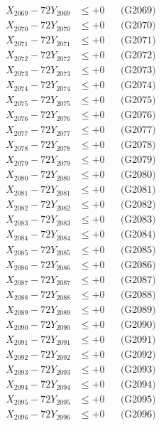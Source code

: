 \documentclass[a4paper,10pt]{article}
\begin{document}
{\begin{align}
X_{2069} - 72Y_{2069} &\leq +0 && \text{(G2069)} \\
X_{2070} - 72Y_{2070} &\leq +0 && \text{(G2070)} \\
\allowbreak
X_{2071} - 72Y_{2071} &\leq +0 && \text{(G2071)} \\
X_{2072} - 72Y_{2072} &\leq +0 && \text{(G2072)} \\
X_{2073} - 72Y_{2073} &\leq +0 && \text{(G2073)} \\
X_{2074} - 72Y_{2074} &\leq +0 && \text{(G2074)} \\
X_{2075} - 72Y_{2075} &\leq +0 && \text{(G2075)} \\
X_{2076} - 72Y_{2076} &\leq +0 && \text{(G2076)} \\
X_{2077} - 72Y_{2077} &\leq +0 && \text{(G2077)} \\
X_{2078} - 72Y_{2078} &\leq +0 && \text{(G2078)} \\
X_{2079} - 72Y_{2079} &\leq +0 && \text{(G2079)} \\
X_{2080} - 72Y_{2080} &\leq +0 && \text{(G2080)} \\
\allowbreak
X_{2081} - 72Y_{2081} &\leq +0 && \text{(G2081)} \\
X_{2082} - 72Y_{2082} &\leq +0 && \text{(G2082)} \\
X_{2083} - 72Y_{2083} &\leq +0 && \text{(G2083)} \\
X_{2084} - 72Y_{2084} &\leq +0 && \text{(G2084)} \\
X_{2085} - 72Y_{2085} &\leq +0 && \text{(G2085)} \\
X_{2086} - 72Y_{2086} &\leq +0 && \text{(G2086)} \\
X_{2087} - 72Y_{2087} &\leq +0 && \text{(G2087)} \\
X_{2088} - 72Y_{2088} &\leq +0 && \text{(G2088)} \\
X_{2089} - 72Y_{2089} &\leq +0 && \text{(G2089)} \\
X_{2090} - 72Y_{2090} &\leq +0 && \text{(G2090)} \\
\allowbreak
X_{2091} - 72Y_{2091} &\leq +0 && \text{(G2091)} \\
X_{2092} - 72Y_{2092} &\leq +0 && \text{(G2092)} \\
X_{2093} - 72Y_{2093} &\leq +0 && \text{(G2093)} \\
X_{2094} - 72Y_{2094} &\leq +0 && \text{(G2094)} \\
X_{2095} - 72Y_{2095} &\leq +0 && \text{(G2095)} \\
X_{2096} - 72Y_{2096} &\leq +0 && \text{(G2096)} \\

\end{align}}
\end{document}
